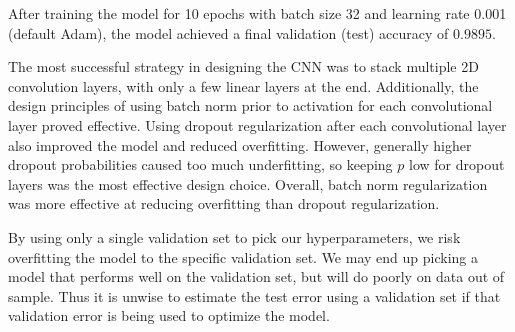 \begin{solution}
    After training the model for 10 epochs with batch size 32 and learning rate 0.001 (default Adam), the model achieved a final validation (test) accuracy of $\boxed{0.9895}$.

    The most successful strategy in designing the CNN was to stack multiple 2D convolution layers, with only a few linear layers at the end. Additionally, the design principles of using batch norm prior to activation for each convolutional layer proved effective. Using dropout regularization after each convolutional layer also improved the model and reduced overfitting. However, generally higher dropout probabilities caused too much underfitting, so keeping $p$ low for dropout layers was the most effective design choice. Overall, batch norm regularization was more effective at reducing overfitting than dropout regularization.


    By using only a single validation set to pick our hyperparameters, we risk overfitting the model to the specific validation set. We may end up picking a model that performs well on the validation set, but will do poorly on data out of sample. Thus it is unwise to estimate the test error using a validation set if that validation error is being used to optimize the model.
\end{solution}



